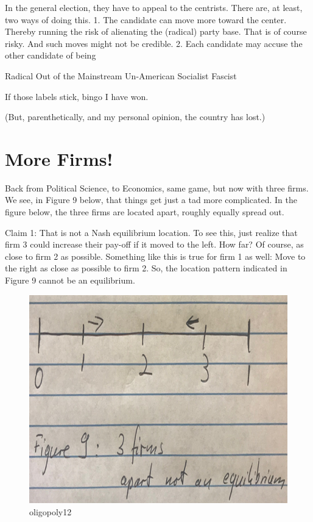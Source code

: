 \documentclass[
]{book}
\begin{document}
In the general election, they have to appeal to the centrists. There are, at least, two ways of doing this.
1. The candidate can move more toward the center. Thereby running the risk of alienating the (radical) party base. That is of course risky. And such moves might not be credible.
2. Each candidate may accuse the other candidate of being

\begin{center}
Radical
Out of the Mainstream
Un-American
Socialist
Fascist

\end{center}

If those labels stick, bingo I have won.

(But, parenthetically, and my personal opinion, the country has lost.)

\hypertarget{more-firms}{%
\section{More Firms!}\label{more-firms}}

Back from Political Science, to Economics, same game, but now with three firms. We see, in Figure 9 below, that things get just a tad more complicated. In the figure below, the three firms are located apart, roughly equally spread out.

Claim 1: That is not a Nash equilibrium location. To see this, just realize that firm 3 could increase their pay-off if it moved to the left. How far? Of course, as close to firm 2 as possible. Something like this is true for firm 1 as well: Move to the right as close as possible to firm 2. So, the location pattern indicated in Figure 9 cannot be an equilibrium.

\begin{figure}

{\centering \includegraphics[width=0.5\linewidth]{img/oligopoly/fig12} 

}

\caption{oligopoly12}\label{fig:oligopoly12}
\end{figure}
\end{document}

